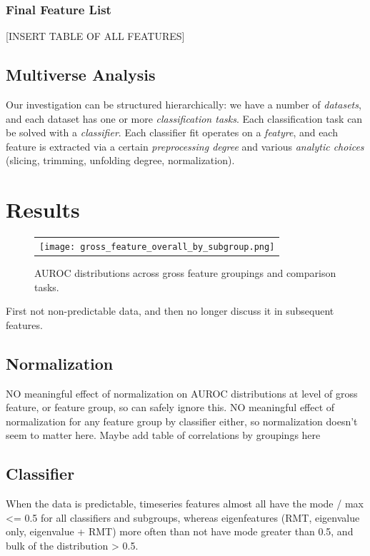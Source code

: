 \documentclass[12pt]{spieman}  %
\begin{document}
\begin{spacing}{2}
\subsubsection{Final Feature List}

[INSERT TABLE OF ALL FEATURES]


\subsection{Multiverse Analysis}
\label{sec:multiverse}

Our investigation can be structured hierarchically: we have a number of
\textit{datasets}, and each dataset has one or more \textit{classification
tasks}. Each classification task can be solved with a \textit{classifier}.
Each classifier fit operates on a \textit{featyre}, and each feature is
extracted via a certain \textit{preprocessing degree} and various
\textit{analytic choices} (slicing, trimming, unfolding degree, normalization).

\section{Results}
\label{sec:results}

\begin{figure}
\begin{center}
\begin{tabular}{c}
\texttt{[image: gross\_feature\_overall\_by\_subgroup.png]}
\end{tabular}
\end{center}
\caption
{ \label{fig:main-results}
AUROC distributions across gross feature groupings and comparison tasks.}
\end{figure}

First not non-predictable data, and then no longer discuss it in subsequent features.

\subsection{Normalization}
NO meaningful effect of normalization on AUROC distributions at level of gross feature, or feature
group, so can safely ignore this.
NO meaningful effect of normalization for any feature group by classifier either, so
normalization doesn't seem to matter here.
Maybe add table of correlations by groupings here

\subsection{Classifier}
When the data is predictable, timeseries features almost all have the mode / max <= 0.5 for all
classifiers and subgroups, whereas eigenfeatures (RMT, eigenvalue only, eigenvalue + RMT) more often
than not have mode greater than 0.5, and bulk of the distribution > 0.5.


\end{spacing}
\end{document}
